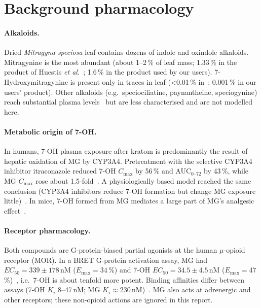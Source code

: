 \documentclass[10pt,a4paper]{article}
\begin{document}
\tableofcontents
\bigskip

\noindent{}

\section{Background pharmacology}

\paragraph{Alkaloids.} Dried \emph{Mitragyna speciosa} leaf contains dozens of indole and oxindole alkaloids. Mitragynine
is the most abundant (about 1--2\,\% of leaf mass; 1.33\,\% in the product of Huestis \emph{et al.}~\cite{huestis2024};
1.6\,\% in the product used by our users). 7-Hydroxymitragynine is present only in traces in leaf
(<0.01\,\% in~\cite{huestis2024}; 0.001\,\% in our users' product). Other alkaloids (e.g.\ speciociliatine, paynantheine,
speciogynine) reach substantial plasma levels~\cite{tanna2022} but are less characterised and are not modelled here.

\paragraph{Metabolic origin of 7-OH.} In humans, 7-OH plasma exposure after kratom is predominantly the result of
hepatic oxidation of MG by CYP3A4. Pretreatment with the selective CYP3A4 inhibitor itraconazole reduced 7-OH $C_{\max}$ by
56\,\% and AUC$_{0\text{--}72}$ by 43\,\%, while MG $C_{\max}$ rose about 1.5-fold~\cite{mongar2024}. A physiologically based
model reached the same conclusion (CYP3A4 inhibitors reduce 7-OH formation but change MG exposure little)~\cite{chiang2026}.
In mice, 7-OH formed from MG mediates a large part of MG's analgesic effect~\cite{kruegel2019}.

\paragraph{Receptor pharmacology.} Both compounds are G-protein-biased partial agonists at the human
$\mu$-opioid receptor (MOR). In a BRET G-protein activation assay, MG had $EC_{50}=339\pm178$\,nM ($E_{\max}=34$\,\%)
and 7-OH $EC_{50}=34.5\pm4.5$\,nM ($E_{\max}=47$\,\%)~\cite{kruegel2016,fda7oh}, i.e.\ 7-OH is about tenfold more potent.
Binding affinities differ between assays (7-OH $K_i$ 8--47\,nM; MG $K_i\approx 230$\,nM)~\cite{fda7oh}. MG also acts at
adrenergic and other receptors; these non-opioid actions are ignored in this report.
\end{document}
